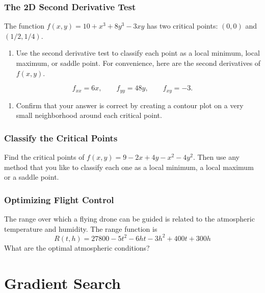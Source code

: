 \documentclass[
]{book}
\providecommand{\tightlist}{%
  \setlength{\itemsep}{0pt}\setlength{\parskip}{0pt}}
\begin{document}
\hypertarget{the-2d-second-derivative-test}{%
\subsection{The 2D Second Derivative Test}\label{the-2d-second-derivative-test}}

The function \(f(x,y)=10 + x^3 + 8y^3 - 3xy\) has two critical points: \((0,0)\) and \((1/2,1/4)\).

\begin{enumerate}
\def\labelenumi{\arabic{enumi}.}
\tightlist
\item
  Use the second derivative test to classify each point as a local minimum, local maximum, or saddle point. For convenience, here are the second derivatives of \(f(x,y)\).
\end{enumerate}

\[
f_{xx} = 6x, \qquad f_{yy} = 48y, \qquad f_{xy} = -3.
\]

\begin{enumerate}
\def\labelenumi{\arabic{enumi}.}
\setcounter{enumi}{1}
\tightlist
\item
  Confirm that your answer is correct by creating a contour plot on a very small neighborhood around each critical point.
\end{enumerate}

\hypertarget{classify-the-critical-points}{%
\subsection{Classify the Critical Points}\label{classify-the-critical-points}}

Find the critical points of \(f(x,y)=9-2x+4y-x^2-4y^2\). Then use any method that you like to classify each one as a local minimum, a local maximum or a saddle point.

\hypertarget{optimizing-flight-control}{%
\subsection{Optimizing Flight Control}\label{optimizing-flight-control}}

The range over which a flying drone can be guided is related to the atmospheric temperature and humidity. The range function is
\[
R(t,h)=27800-5t^2-6ht-3h^2+400t+300h
\]
What are the optimal atmospheric conditions?

\hypertarget{gradient-search-1}{%
\chapter{Gradient Search}\label{gradient-search-1}}
\end{document}
